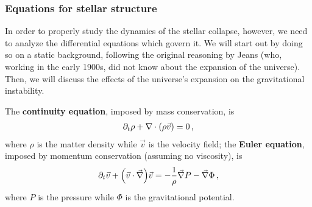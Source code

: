 \documentclass[main.tex]{subfiles}
\begin{document}


\subsubsection{Equations for stellar structure}

In order to properly study the dynamics of the stellar collapse, however, we need to analyze the differential equations which govern it. 
We will start out by doing so on a static background, following the original reasoning by Jeans (who, working in the early 1900s, did not know about the expansion of the universe). Then, we will discuss the effects of the universe's expansion on the gravitational instability. 

The \textbf{continuity equation}, imposed by mass conservation, is
%
\begin{align}
  \partial_{t} \rho + \nabla \cdot \qty(\rho \vec{v}) = 0
\,,
\end{align}
%
where \(\rho \) is the matter density while \(\vec{v}\) is the velocity field; the \textbf{Euler equation}, imposed by momentum conservation (assuming no viscosity), is 
%
\begin{align}
  \partial_{t} \vec{v} + \qty(\vec{v} \cdot \vec{\nabla}) \vec{v}
  = - \frac{1}{\rho } \vec{\nabla} P - \vec{\nabla} \Phi 
\,,
\end{align}
%
where \(P\) is the pressure while \(\Phi \) is the gravitational potential.
\end{document}
